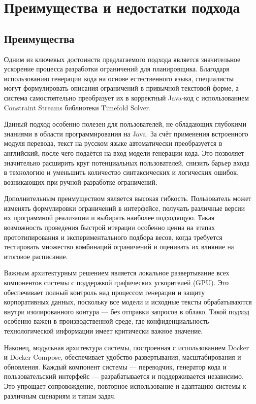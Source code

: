 \section{Преимущества и недостатки подхода}

\subsection{Преимущества}

Одним из ключевых достоинств предлагаемого подхода является значительное ускорение процесса разработки ограничений для планировщика. Благодаря использованию генерации кода на основе естественного языка, специалисты могут формулировать описания ограничений в привычной текстовой форме, а система самостоятельно преобразует их в корректный Java-код с использованием Constraint Streams библиотеки Timefold Solver.

Данный подход особенно полезен для пользователей, не обладающих глубокими знаниями в области программирования на Java. За счёт применения встроенного модуля перевода, текст на русском языке автоматически преобразуется в английский, после чего подаётся на вход модели генерации кода. Это позволяет значительно расширить круг потенциальных пользователей, снизить барьер входа в технологию и уменьшить количество синтаксических и логических ошибок, возникающих при ручной разработке ограничений.

Дополнительным преимуществом является высокая гибкость. Пользователь может изменять формулировки ограничений в интерфейсе, получать различные версии их программной реализации и выбирать наиболее подходящую. Такая возможность проведения быстрой итерации особенно ценна на этапах прототипирования и экспериментального подбора весов, когда требуется тестировать множество комбинаций ограничений и оценивать их влияние на итоговое расписание.

Важным архитектурным решением является локальное развертывание всех компонентов системы с поддержкой графических ускорителей (GPU). Это обеспечивает полный контроль над процессом генерации и защиту корпоративных данных, поскольку все модели и исходные тексты обрабатываются внутри изолированного контура — без отправки запросов в облако. Такой подход особенно важен в производственной среде, где конфиденциальность технологической информации имеет критически важное значение.

Наконец, модульная архитектура системы, построенная с использованием Docker и Docker Compose, обеспечивает удобство развертывания, масштабирования и обновления. Каждый компонент системы — переводчик, генератор кода и пользовательский интерфейс — разрабатывается и поддерживается независимо. Это упрощает сопровождение, повторное использование и адаптацию системы к различным сценариям и типам задач.

